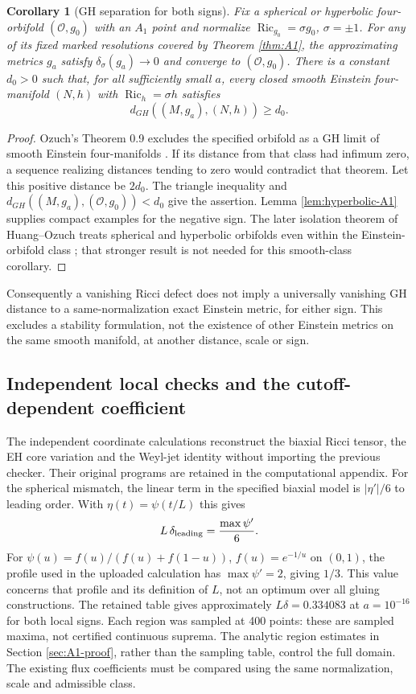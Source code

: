\documentclass[a4paper,11pt]{article}
\numberwithin{equation}{section}
\newtheorem{corollary}[theorem]{Corollary}
\theoremstyle{definition}
\newcommand{\Ric}{\operatorname{Ric}}
\begin{document}
\begin{corollary}[GH separation for both signs]\label{cor:both-sign-GH}
Fix a spherical or hyperbolic four-orbifold $(\mathcal O,g_0)$ with an $A_1$ point and normalize $\Ric_{g_0}=\sigma g_0$, $\sigma=\pm1$. For any of its fixed marked resolutions covered by Theorem \ref{thm:A1}, the approximating metrics $g_a$ satisfy $\delta_\sigma(g_a)\to0$ and converge to $(\mathcal O,g_0)$. There is a constant $d_0>0$ such that, for all sufficiently small $a$, every closed smooth Einstein four-manifold $(N,h)$ with $\Ric_h=\sigma h$ satisfies
\[
 d_{GH}((M,g_a),(N,h))\ge d_0.
\]
\end{corollary}
\begin{proof}
Ozuch's Theorem 0.9 excludes the specified orbifold as a GH limit of smooth Einstein four-manifolds \cite{OzuchIntegrability}. If its distance from that class had infimum zero, a sequence realizing distances tending to zero would contradict that theorem. Let this positive distance be $2d_0$. The triangle inequality and $d_{GH}((M,g_a),(\mathcal O,g_0))<d_0$ give the assertion. Lemma \ref{lem:hyperbolic-A1} supplies compact examples for the negative sign. The later isolation theorem of Huang--Ozuch treats spherical and hyperbolic orbifolds even within the Einstein-orbifold class \cite{HuangOzuch}; that stronger result is not needed for this smooth-class corollary.
\end{proof}
Consequently a vanishing Ricci defect does not imply a universally vanishing GH distance to a same-normalization exact Einstein metric, for either sign. This excludes a stability formulation, not the existence of other Einstein metrics on the same smooth manifold, at another distance, scale or sign.

\subsection{Independent local checks and the cutoff-dependent coefficient}\label{sec:profile-coefficient}
The independent coordinate calculations reconstruct the biaxial Ricci tensor, the EH core variation and the Weyl-jet identity without importing the previous checker. Their original programs are retained in the computational appendix. For the spherical mismatch, the linear term in the specified biaxial model is $|\eta'|/6$ to leading order. With $\eta(t)=\psi(t/L)$ this gives
\[
 L\,\delta_{\rm leading}=\frac{\max\psi'}6.
\]
For $\psi(u)=f(u)/(f(u)+f(1-u))$, $f(u)=e^{-1/u}$ on $(0,1)$, the profile used in the uploaded calculation has $\max\psi'=2$, giving $1/3$. This value concerns that profile and its definition of $L$, not an optimum over all gluing constructions. The retained table gives approximately $L\delta=0.334083$ at $a=10^{-16}$ for both local signs. Each region was sampled at 400 points: these are sampled maxima, not certified continuous suprema. The analytic region estimates in Section \ref{sec:A1-proof}, rather than the sampling table, control the full domain. The existing flux coefficients must be compared using the same normalization, scale and admissible class.
\end{document}
